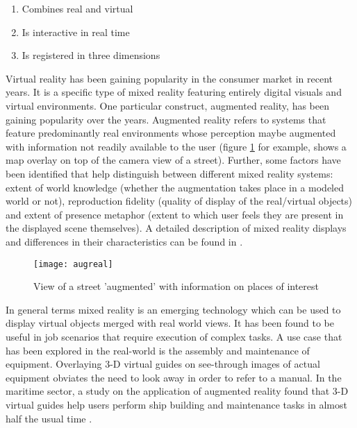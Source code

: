 \begin{enumerate}
	\item Combines real and virtual 
	\item Is interactive in real time
	\item Is registered in three dimensions
\end{enumerate} 

Virtual reality has been gaining popularity in the consumer market in recent years. It is a specific type of mixed reality featuring entirely digital visuals and virtual environments. One particular construct, augmented reality, has been gaining popularity over the years. Augmented reality refers to systems that feature predominantly real environments whose perception maybe augmented with information not readily available to the user (figure \ref{fig:augreal} for example, shows a map overlay on top of the camera view of a street). Further, some factors have been identified that help distinguish between different mixed reality systems: extent of world knowledge (whether the augmentation takes place in a modeled world or not), reproduction fidelity (quality of display of the real/virtual objects) and extent of presence metaphor (extent to which user feels they are present in the displayed scene themselves). A detailed description of mixed reality displays and differences in their characteristics can be found in \cite{milgram1995augmented}. 

\begin{figure}
	\centering
	\texttt{[image: augreal]}
	\caption{View of a street 'augmented' with information on places of interest}
	\label{fig:augreal}
\end{figure}

In general terms mixed reality is an emerging technology which can be used to display virtual objects merged with real world views. It has been found to be useful in job scenarios that require execution of complex tasks. A use case that has been explored in the real-world is the assembly and maintenance of equipment. Overlaying 3-D virtual guides on see-through images of actual equipment obviates the need to look away in order to refer to a manual. In the maritime sector, a study on the application of augmented reality found that 3-D virtual guides help users perform ship building and maintenance tasks in almost half the usual time \parencite{henderson2011exploring}.